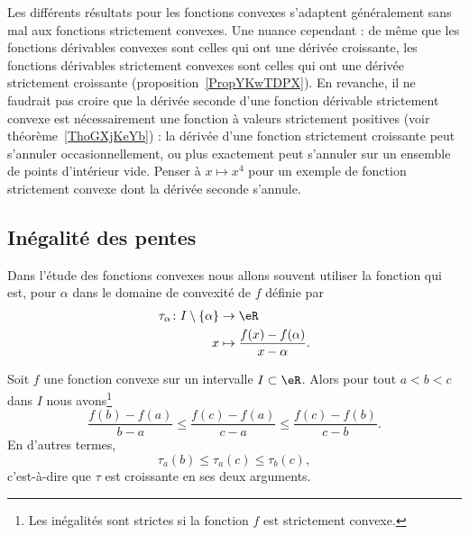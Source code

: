 \begin{normaltext}
    Les différents résultats pour les fonctions convexes s'adaptent généralement sans mal aux fonctions strictement convexes. Une nuance cependant : de même que les fonctions dérivables convexes sont celles qui ont une dérivée croissante, les fonctions dérivables strictement convexes sont celles qui ont une dérivée strictement croissante (proposition~\ref{PropYKwTDPX}). En revanche, il ne faudrait pas croire que la dérivée seconde d'une fonction dérivable strictement convexe est nécessairement une fonction à valeurs strictement positives (voir théorème~\ref{ThoGXjKeYb}) : la dérivée d'une fonction strictement croissante peut s'annuler occasionnellement, ou plus exactement peut s'annuler sur un ensemble de points d'intérieur vide. Penser à \( x\mapsto x^4\) pour un exemple de fonction strictement convexe dont la dérivée seconde s'annule.
\end{normaltext}

\subsection{Inégalité des pentes}

Dans l'étude des fonctions convexes nous allons souvent utiliser la fonction  qui est, pour \( \alpha\) dans le domaine de convexité de \( f\) définie par
\begin{equation}    \label{EqRYBazWd}
    \begin{aligned}
        \tau_{\alpha}\colon I\setminus\{ \alpha \}  & \to \eR   \\
                            x                       & \mapsto \frac{ f(x)-f(\alpha) }{ x-\alpha }.
    \end{aligned}
\end{equation}

\begin{proposition} \label{PropMDMGjGO}
    Soit \( f\) une fonction convexe sur un intervalle \( I\subset \eR\). Alors pour tout \( a<b<c\) dans \( I\) nous avons\footnote{Les inégalités sont strictes si la fonction \( f\) est strictement convexe.}
    \begin{equation}
        \frac{ f(b)-f(a)  }{ b-a }\leq\frac{ f(c)-f(a) }{ c-a }\leq \frac{ f(c)-f(b) }{ c-b }.
    \end{equation}
    En d'autres termes,
    \begin{equation}
        \tau_a(b)\leq\tau_a(c)\leq \tau_b(c),
    \end{equation}
    c'est-à-dire que \( \tau\) est croissante en ses deux arguments.
\end{proposition}

